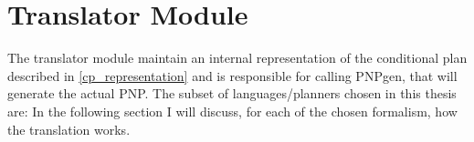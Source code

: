 \documentclass[pdftex,12pt,a4paper]{report}
\begin{document}
\section{Translator Module}
The translator module maintain an internal representation of the conditional plan described in \ref{cp_representation} and is responsible for calling PNPgen, that will generate the actual PNP.
The subset of languages/planners chosen in this thesis are:
In the following section I will discuss, for each of the chosen formalism, how the translation works.  
\end{document}
